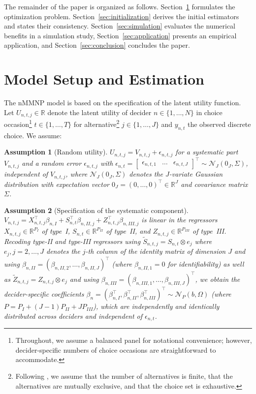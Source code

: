 \documentclass[preprint,12pt,authoryear]{elsarticle}
\newtheorem{assumption}{Assumption}
\newcommand{\Normal}[2]{\mathcal{N}_{#1}\left(#2 \right)}
\newcommand{\R}{\mathbb{R}}
\begin{document}
The remainder of the paper is organized as follows. Section~\ref{sec:problem} formulates the optimization problem. Section~\ref{sec:initialization} derives the initial estimators and states their consistency. Section~\ref{sec:simulation} evaluates the numerical benefits in a simulation study, Section~\ref{sec:application} presents an empirical application, and Section~\ref{sec:conclusion} concludes the paper.

\section{Model Setup and Estimation}\label{sec:problem}

The nMMNP model is based on the specification of the latent utility function.
Let $U_{n,t,j} \in \R$ denote the latent utility of decider $n \in \{1, \dots, N\}$ in choice occasion\footnote{Throughout, we assume a balanced panel for notational convenience; however, decider-specific numbers of choice occasions are straightforward to accommodate.} $t \in \{1, \dots, T\}$ for alternative\footnote{Following \citet{Train2009}, we assume that the number of alternatives is finite, that the alternatives are mutually exclusive, and that the choice set is exhaustive.} $j \in \{1, \dots, J\}$ and $y_{n,t}$ the observed discrete choice. We assume:

\begin{assumption}[Random utility]\label{asm:rum}
$U_{n,t,j} = V_{n,t,j} + \epsilon_{n,t,j}$ for a systematic part $V_{n,t,j}$ and a random error $\epsilon_{n,t,j}$ with $\epsilon_{n,t} = \begin{bmatrix} \epsilon_{n,t,1} & \dots & \epsilon_{n,t,J} \end{bmatrix}^\top \sim \Normal{J}{0_J, \Sigma}$, independent of $V_{n,t,j}$, where $\Normal{J}{0_J, \Sigma}$ denotes the $J$-variate Gaussian distribution with expectation vector $0_J = (0,\dots,0)^\top \in \R^J$ and covariance matrix $\Sigma$.
\end{assumption}

\begin{assumption}[Specification of the systematic component]\label{asm:systematic}
$V_{n,t,j} = X_{n,t,j}^\top \beta_{n,I} + S_{n,t}^\top \beta_{n,II,j} + Z_{n,t,j}^\top \beta_{n,III,j}$ is linear in the regressors $X_{n,t,j} \in \R^{P_I}$ of type~I, $S_{n,t} \in \R^{P_{II}}$ of type~II, and $Z_{n,t,j} \in \R^{P_{III}}$ of type~III. Recoding type-II and type-III regressors using $\tilde S_{n,t,j} = S_{n,t} \otimes e_j$ where $e_j, j=2,\dots,J$ denotes the $j$-th column of the identity matrix of dimension $J$ and using $\beta_{n,II} = (\beta_{n,II,2},\dots,\beta_{n,II,J})^\top$ (where $\beta_{n,II,1}=0$ for identifiability) as well as $\tilde Z_{n,t,j} = Z_{n,t,j} \otimes e_j$ and using $\beta_{n,III} = (\beta_{n,III,1},\dots,\beta_{n,III,J})^\top$, we obtain the decider-specific coefficients $\beta_n = (\beta_{n,I}^\top,\beta_{n,II}^\top,\beta_{n,III}^\top)^\top \sim \Normal{P}{b, \Omega}$ (where $P=P_I+(J-1)P_{II}+JP_{III}$), which are independently and identically distributed across deciders and independent of $\epsilon_{n,t}$.
\end{assumption}
\end{document}
